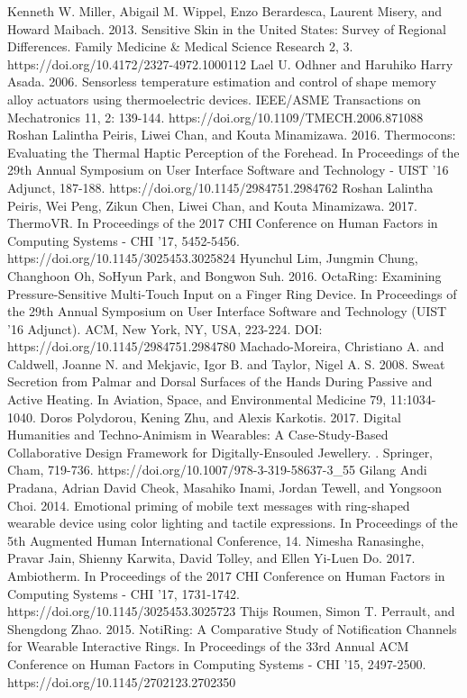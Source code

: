 \documentclass[preprint,12pt]{elsarticle}
\begin{document}
\begin{thebibliography}{00}
Kenneth W. Miller, Abigail M. Wippel, Enzo Berardesca, Laurent Misery, and Howard Maibach. 2013. Sensitive Skin in the United States: Survey of Regional Differences. Family Medicine \& Medical Science Research 2, 3. https://doi.org/10.4172/2327-4972.1000112
Lael U. Odhner and Haruhiko Harry Asada. 2006. Sensorless temperature estimation and control of shape memory alloy actuators using thermoelectric devices. IEEE/ASME Transactions on Mechatronics 11, 2: 139-144. https://doi.org/10.1109/TMECH.2006.871088
Roshan Lalintha Peiris, Liwei Chan, and Kouta Minamizawa. 2016. Thermocons: Evaluating the Thermal Haptic Perception of the Forehead. In Proceedings of the 29th Annual Symposium on User Interface Software and Technology - UIST '16 Adjunct, 187-188. https://doi.org/10.1145/2984751.2984762
Roshan Lalintha Peiris, Wei Peng, Zikun Chen, Liwei Chan, and Kouta Minamizawa. 2017. ThermoVR. In Proceedings of the 2017 CHI Conference on Human Factors in Computing Systems - CHI '17, 5452-5456. https://doi.org/10.1145/3025453.3025824
Hyunchul Lim, Jungmin Chung, Changhoon Oh, SoHyun Park, and Bongwon Suh. 2016. OctaRing: Examining Pressure-Sensitive Multi-Touch Input on a Finger Ring Device. In Proceedings of the 29th Annual Symposium on User Interface Software and Technology (UIST '16 Adjunct). ACM, New York, NY, USA, 223-224. DOI: https://doi.org/10.1145/2984751.2984780
Machado-Moreira, Christiano A. and Caldwell, Joanne N. and Mekjavic, Igor B. and Taylor, Nigel A. S. 2008. Sweat Secretion from Palmar and Dorsal Surfaces of the Hands During Passive and Active Heating. In Aviation, Space, and Environmental Medicine 79, 11:1034-1040.
Doros Polydorou, Kening Zhu, and Alexis Karkotis. 2017. Digital Humanities and Techno-Animism in Wearables: A Case-Study-Based Collaborative Design Framework for Digitally-Ensouled Jewellery. . Springer, Cham, 719-736. https://doi.org/10.1007/978-3-319-58637-3\_55
Gilang Andi Pradana, Adrian David Cheok, Masahiko Inami, Jordan Tewell, and Yongsoon Choi. 2014. Emotional priming of mobile text messages with ring-shaped wearable device using color lighting and tactile expressions. In Proceedings of the 5th Augmented Human International Conference, 14.
Nimesha Ranasinghe, Pravar Jain, Shienny Karwita, David Tolley, and Ellen Yi-Luen Do. 2017. Ambiotherm. In Proceedings of the 2017 CHI Conference on Human Factors in Computing Systems - CHI '17, 1731-1742. https://doi.org/10.1145/3025453.3025723
Thijs Roumen, Simon T. Perrault, and Shengdong Zhao. 2015. NotiRing: A Comparative Study of Notification Channels for Wearable Interactive Rings. In Proceedings of the 33rd Annual ACM Conference on Human Factors in Computing Systems - CHI '15, 2497-2500. https://doi.org/10.1145/2702123.2702350

\end{thebibliography}
\end{document}
